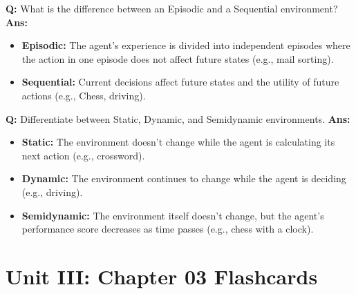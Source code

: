 \documentclass[10pt,a4paper,twocolumn]{article}
\begin{document}
\begin{tcolorbox}[
  colback=white,
  colframe=UnitColorTwo,
  colbacktitle=gray!10!white,
  coltitle=black,
  fonttitle=\bfseries\sffamily\small,
  title={Unit II $\bullet$ Card 8: Episodic vs. Sequential Environments},
  boxrule=1.2pt,
  arc=2mm,
  outer arc=2mm,
  boxsep=1.5mm,
  top=1mm,
  bottom=1mm,
  left=1.5mm,
  right=1.5mm,
  before skip=2.5mm,
  after skip=2.5mm
]
\textbf{Q:} What is the difference between an Episodic and a Sequential environment?
\tcbline
\textbf{Ans:} \begin{itemize}
  \item   \textbf{Episodic:} The agent's experience is divided into independent episodes where the action in one episode does not affect future states (e.g., mail sorting).
  \item   \textbf{Sequential:} Current decisions affect future states and the utility of future actions (e.g., Chess, driving).
\end{itemize}
\end{tcolorbox}


\begin{tcolorbox}[
  colback=white,
  colframe=UnitColorTwo,
  colbacktitle=gray!10!white,
  coltitle=black,
  fonttitle=\bfseries\sffamily\small,
  title={Unit II $\bullet$ Card 9: Static vs. Dynamic vs. Semidynamic Environments},
  boxrule=1.2pt,
  arc=2mm,
  outer arc=2mm,
  boxsep=1.5mm,
  top=1mm,
  bottom=1mm,
  left=1.5mm,
  right=1.5mm,
  before skip=2.5mm,
  after skip=2.5mm
]
\textbf{Q:} Differentiate between Static, Dynamic, and Semidynamic environments.
\tcbline
\textbf{Ans:} \begin{itemize}
  \item   \textbf{Static:} The environment doesn't change while the agent is calculating its next action (e.g., crossword).
  \item   \textbf{Dynamic:} The environment continues to change while the agent is deciding (e.g., driving).
  \item   \textbf{Semidynamic:} The environment itself doesn't change, but the agent's performance score decreases as time passes (e.g., chess with a clock).
\end{itemize}
\end{tcolorbox}

\section*{Unit III: Chapter 03 Flashcards}
\end{document}

